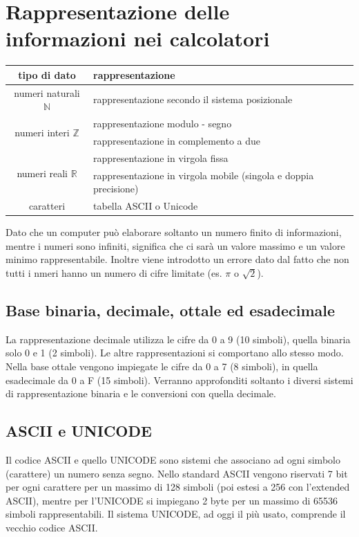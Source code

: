 \documentclass{article}
\begin{document}
\section{Rappresentazione delle informazioni nei calcolatori}
\begin{center}
	\begin{tabularx}{\textwidth}{c X}
		\textbf{tipo di dato} & \textbf{rappresentazione} \\
		\toprule
		numeri naturali \(\mathbb{N}\) & rappresentazione secondo il sistema posizionale \\
		\midrule
		\multirow{2}{*}{numeri interi \(\mathbb{Z}\)} & rappresentazione modulo - segno \\
		& rappresentazione in complemento a due \\
		\midrule
		\multirow{2}{*}{numeri reali \(\mathbb{R}\)} & rappresentazione in virgola fissa \\
		& rappresentazione in virgola mobile (singola e doppia precisione) \\
		\midrule
		caratteri & tabella ASCII o Unicode
	\end{tabularx}
\end{center}

Dato che un computer può elaborare soltanto un numero finito di informazioni, mentre i numeri sono infiniti, significa che
ci sarà un valore massimo e un valore minimo rappresentabile. Inoltre viene introdotto un errore dato dal fatto che non tutti
i nmeri hanno un numero di cifre limitate (es. \(\pi\) o \(\sqrt{2}\)).

\subsection{Base binaria, decimale, ottale ed esadecimale}
La rappresentazione decimale utilizza le cifre da 0 a 9 (10 simboli), quella binaria solo 0 e 1 (2 simboli). Le altre
rappresentazioni si comportano allo stesso modo. Nella base ottale vengono impiegate le cifre da 0 a 7 (8 simboli),
in quella esadecimale da 0 a F (15 simboli). Verranno approfonditi soltanto i diversi sistemi di rappresentazione
binaria e le conversioni con quella decimale.

\subsection{ASCII e UNICODE}
Il codice ASCII e quello UNICODE sono sistemi che associano ad ogni simbolo (carattere) un numero senza segno. Nello standard
ASCII vengono riservati 7 bit per ogni carattere per un massimo di 128 simboli (poi estesi a 256 con l'extended ASCII), mentre
per l'UNICODE si impiegano 2 byte per un massimo di 65536 simboli rappresentabili. Il sistema UNICODE, ad oggi il più usato,
comprende il vecchio codice ASCII.
\end{document}
